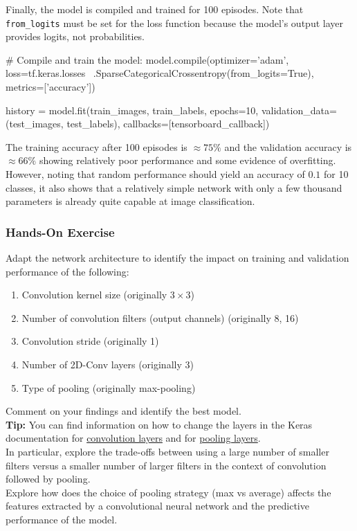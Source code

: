 Finally, the model is compiled and trained for 100 episodes. Note that \texttt{from\_logits} must be set for the loss function because the model's output layer provides logits, not probabilities.

\begin{samepage}
\begin{pythoncode}
# Compile and train the model:
model.compile(optimizer='adam',
    loss=tf.keras.losses \
        .SparseCategoricalCrossentropy(from_logits=True),
    metrics=['accuracy'])

history = model.fit(train_images, train_labels, 
    epochs=10, 
    validation_data=(test_images, test_labels),
    callbacks=[tensorboard_callback])
\end{pythoncode}
\end{samepage}

The training accuracy after 100 episodes is $\approx 75\%$ and the validation accuracy is $\approx 66\%$ showing relatively poor performance and some evidence of overfitting. However, noting that random performance should yield an accuracy of $0.1$ for 10 classes, it also shows that a relatively simple network with only a few thousand parameters is already quite capable at image classification. 

\begin{tcolorbox}[colback=code]
\subsubsection*{Hands-On Exercise} 
Adapt the network architecture to identify the impact on training and validation performance of the following:
   \begin{enumerate}
      \item Convolution kernel size (originally $3 \times 3$)
      \item Number of convolution filters (output channels) (originally 8, 16)
      \item Convolution stride (originally 1)
      \item Number of 2D-Conv layers (originally 3)
      \item Type of pooling (originally max-pooling)
   \end{enumerate} 
Comment on your findings and identify the best model.\\

\textbf{Tip:} You can find information on how to change the layers in the Keras documentation for \href{https://keras.io/2.16/api/layers/convolution_layers/}{convolution layers} and for \href{https://keras.io/2.16/api/layers/pooling_layers/}{pooling layers}. \\

In particular, explore the trade-offs between using a large number of smaller filters versus a smaller number of larger filters in the context of convolution followed by pooling. \\

Explore how does the choice of pooling strategy (max vs average) affects the features extracted by a convolutional neural network and the predictive performance of the model.\\
\end{tcolorbox}

